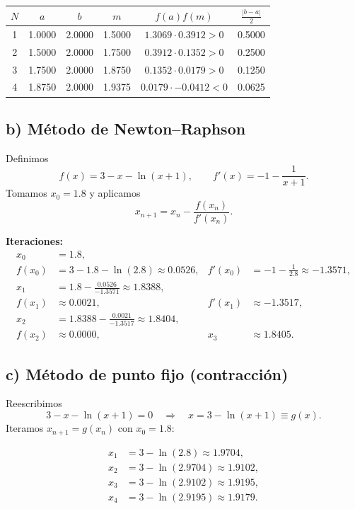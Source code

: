 \documentclass[12pt]{article}
\begin{document}
\begin{center}
\begin{center}
\begin{tabular}{@{}cccccc@{}}
\toprule
\(N\) & \(a\)     & \(b\)     & \(m\)    & \(f(a)f(m)\)            & \(\tfrac{|b-a|}{2}\) \\ 
\midrule
1     & 1.0000    & 2.0000    & 1.5000   & \(1.3069\cdot0.3912>0\) & 0.5000               \\
2     & 1.5000    & 2.0000    & 1.7500   & \(0.3912\cdot0.1352>0\) & 0.2500               \\
3     & 1.7500    & 2.0000    & 1.8750   & \(0.1352\cdot0.0179>0\) & 0.1250               \\
4     & 1.8750    & 2.0000    & 1.9375   & \(0.0179\cdot-0.0412<0\)& 0.0625               \\
\bottomrule
\end{tabular}
\end{center}

\subsection*{b) Método de Newton–Raphson}

Definimos
\[
f(x)=3-x-\ln(x+1),\qquad f'(x)=-1-\frac1{x+1}.
\]
Tomamos \(x_0=1.8\) y aplicamos
\[
x_{n+1}=x_n-\frac{f(x_n)}{f'(x_n)}.
\]

\textbf{Iteraciones:}
\[
\begin{aligned}
x_0&=1.8,\\
f(x_0)&=3-1.8-\ln(2.8)\approx0.0526, 
&f'(x_0)&=-1-\frac1{2.8}\approx-1.3571,\\
x_1&=1.8-\frac{0.0526}{-1.3571}\approx1.8388,\\
f(x_1)&\approx0.0021, 
&f'(x_1)&\approx-1.3517,\\
x_2&=1.8388-\frac{0.0021}{-1.3517}\approx1.8404,\\
f(x_2)&\approx0.0000, 
&x_3&\approx1.8405.
\end{aligned}
\]

\subsection*{c) Método de punto fijo (contracción)}

Reescribimos
\[
3 - x - \ln(x+1)=0
\quad\Longrightarrow\quad
x = 3 - \ln(x+1)
\equiv g(x).
\]
Iteramos \(x_{n+1}=g(x_n)\) con \(x_0=1.8\):

\[
\begin{aligned}
x_1&=3-\ln(2.8)\approx1.9704,\\
x_2&=3-\ln(2.9704)\approx1.9102,\\
x_3&=3-\ln(2.9102)\approx1.9195,\\
x_4&=3-\ln(2.9195)\approx1.9179.
\end{aligned}
\]


\end{center}
\end{document}
